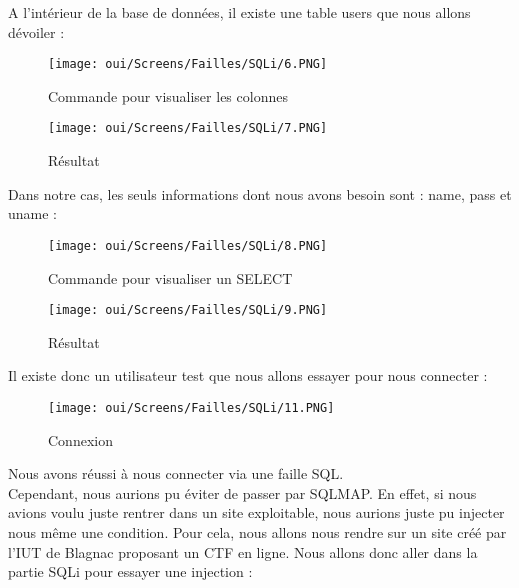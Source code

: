 A l’intérieur de la base de données, il existe une table users que nous allons dévoiler :

\begin{figure}[htp!]
  \centering
  \setlength\figureheight{7cm}
  \setlength\figurewidth{9cm}
  \texttt{[image: oui/Screens/Failles/SQLi/6.PNG]}
  \caption{Commande pour visualiser les colonnes}
  \label{fig:courbe-tikz}
\end{figure}

\begin{figure}[htp!]
  \centering
  \setlength\figureheight{7cm}
  \setlength\figurewidth{9cm}
  \texttt{[image: oui/Screens/Failles/SQLi/7.PNG]}
  \caption{Résultat}
  \label{fig:courbe-tikz}
\end{figure}

\newpage
Dans notre cas, les seuls informations dont nous avons besoin sont : name, pass et uname :

\begin{figure}[htp!]
  \centering
  \setlength\figureheight{7cm}
  \setlength\figurewidth{9cm}
  \texttt{[image: oui/Screens/Failles/SQLi/8.PNG]}
  \caption{Commande pour visualiser un SELECT}
  \label{fig:courbe-tikz}
\end{figure}

\begin{figure}[htp!]
  \centering
  \setlength\figureheight{7cm}
  \setlength\figurewidth{9cm}
  \texttt{[image: oui/Screens/Failles/SQLi/9.PNG]}
  \caption{Résultat}
  \label{fig:courbe-tikz}
\end{figure}

Il existe donc un utilisateur test que nous allons essayer pour nous connecter :

\begin{figure}[htp!]
  \centering
  \setlength\figureheight{7cm}
  \setlength\figurewidth{9cm}
  \texttt{[image: oui/Screens/Failles/SQLi/11.PNG]}
  \caption{Connexion}
  \label{fig:courbe-tikz}
\end{figure}

\newpage
Nous avons réussi à nous connecter via une faille SQL.\\
Cependant, nous aurions pu éviter de passer par SQLMAP. En effet, si nous avions voulu juste rentrer dans un site exploitable, nous aurions juste pu injecter nous même une condition. Pour cela, nous allons nous rendre sur un site créé par l’IUT de Blagnac proposant un CTF en ligne. Nous allons donc aller dans la partie SQLi pour essayer une injection :

